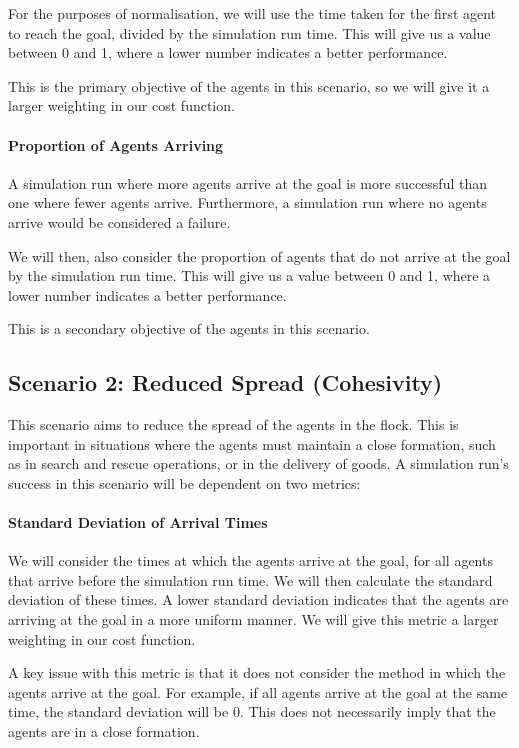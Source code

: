 \documentclass[12pt]{article}
\begin{document}
For the purposes of normalisation, we will use the time taken for the first agent to reach the goal, divided by the simulation run time. This will give us a value between 0 and 1, where a lower number indicates a better performance.

This is the primary objective of the agents in this scenario, so we will give it a larger weighting in our cost function.

\paragraph{Proportion of Agents Arriving} A simulation run where more agents arrive at the goal is more successful than one where fewer agents arrive. Furthermore, a simulation run where no agents arrive would be considered a failure.

We will then, also consider the proportion of agents that do not arrive at the goal by the simulation run time. This will give us a value between 0 and 1, where a lower number indicates a better performance.

This is a secondary objective of the agents in this scenario.

\subsection{Scenario 2: Reduced Spread (Cohesivity)}
This scenario aims to reduce the spread of the agents in the flock. This is important in situations where the agents must maintain a close formation, such as in search and rescue operations, or in the delivery of goods. A simulation run's success in this scenario will be dependent on two metrics:

\paragraph{Standard Deviation of Arrival Times} We will consider the times at which the agents arrive at the goal, for all agents that arrive before the simulation run time. We will then calculate the standard deviation of these times. A lower standard deviation indicates that the agents are arriving at the goal in a more uniform manner. We will give this metric a larger weighting in our cost function.

A key issue with this metric is that it does not consider the method in which the agents arrive at the goal. For example, if all agents arrive at the goal at the same time, the standard deviation will be 0. This does not necessarily imply that the agents are in a close formation.
\end{document}
